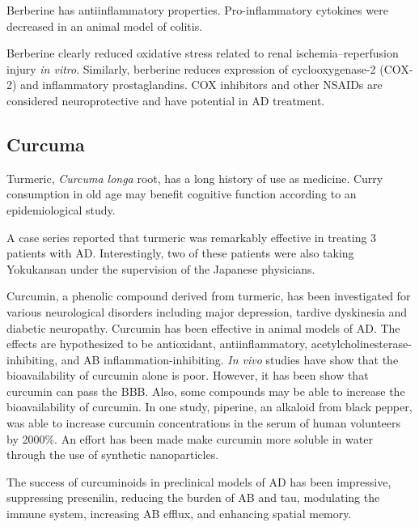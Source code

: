 Berberine has antiinflammatory properties.
Pro-inflammatory cytokines were decreased in an animal model of colitis.
\cite{yan2012berberine}

Berberine clearly reduced oxidative stress
related to renal ischemia–reperfusion injury
\textit{in vitro}.
\cite{yu2013berberine}
Similarly, berberine reduces expression of cyclooxygenase-2 (COX-2)
and inflammatory prostaglandins.
\cite{singh2011berberine}
COX inhibitors and other NSAIDs are considered neuroprotective
and have potential in AD treatment.
\cite{hoozemans2005role}







\subsection{Curcuma}

Turmeric, \textit{Curcuma longa} root, has a long history of use as medicine.
\cite{?}
Curry consumption in old age may benefit cognitive function
according to an epidemiological study.
\cite{ng2006curry}

A case series reported that turmeric was remarkably effective
in treating 3 patients with AD.
Interestingly, two of these patients were also taking
Yokukansan under the supervision of the Japanese physicians.
\cite{hishikawa2012effects}





Curcumin, a phenolic compound derived from turmeric,
has been investigated for various neurological disorders including
major depression, tardive dyskinesia and diabetic neuropathy.
\cite{kulkarni2010overview}
Curcumin has been effective in animal models of AD.
\cite{?}
The effects are hypothesized to be antioxidant, antiinflammatory,
acetylcholinesterase-inhibiting,
and AB inflammation-inhibiting.
\cite{?}
\textit{In vivo} studies have show that
the bioavailability of curcumin alone is poor.
\cite{?}
However, it has been show that curcumin can pass the BBB.
Also, some compounds may be able to increase the bioavailability
of curcumin. In one study, piperine, an alkaloid from black pepper,
was able to increase curcumin concentrations in the
serum of human volunteers by 2000\%.
\cite{shoba1998log}
An effort has been made make curcumin more soluble in water
through the use of synthetic nanoparticles.
\cite{mathew2012curcumin}

The success of curcuminoids in preclinical models of AD has been impressive,
suppressing presenilin,
reducing the burden of AB and tau,
modulating the immune system,
increasing AB efflux,
and enhancing spatial memory.
\cite{
yoshida2011turmeric,
shytle2012optimized,
ahmed2010curcuminoids,
ahmed2011comparative,
zhang2006curcuminoids,
villaflores2012effects}

